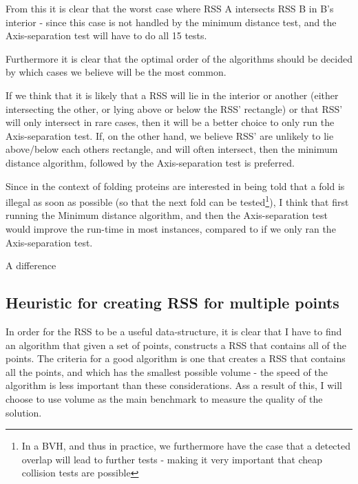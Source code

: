 From this it is clear that the worst case where RSS A intersects RSS B in B's interior - since this case is not handled by the minimum distance test, and the Axis-separation test will have to do all 15 tests.

Furthermore it is clear that the optimal order of the algorithms should be decided by which cases we believe will be the most common. 

If we think that it is likely that a RSS will lie in the interior or another (either intersecting the other, or lying above or below the RSS' rectangle) or that RSS' will only intersect in rare cases, then it will be a better choice to only run the Axis-separation test. If, on the other hand, we believe RSS' are unlikely to lie above/below each others rectangle, and will often intersect, then the minimum distance algorithm, followed by the Axis-separation test is preferred.

Since in the context of folding proteins are interested in being told that a fold is illegal as soon as possible (so that the next fold can be tested\footnote{In a BVH, and thus in practice, we furthermore have the case that a detected overlap will lead to further tests - making it very important that cheap collision tests are possible}), I think that first running the Minimum distance algorithm, and then the Axis-separation test would improve the run-time in most instances, compared to if we only ran the Axis-separation test.

A difference 

\subsection{Heuristic for creating RSS for multiple points}
In order for the RSS to be a useful data-structure, it is clear that I have to find an algorithm that given a set of points, constructs a RSS that contains all of the points. The criteria for a good algorithm is one that creates a RSS that contains all the points, and which has the smallest possible volume - the speed of the algorithm is less important than these considerations. Ass a result of this, I will choose to use volume as the main benchmark to measure the quality of the solution.

